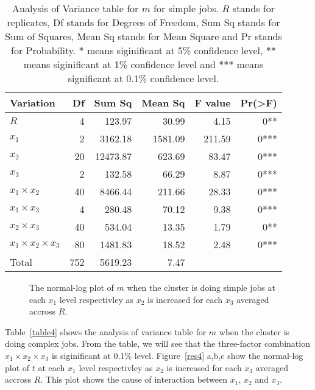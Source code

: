 \documentclass[preprint]{acm_proc_article-sp}
\begin{document}
\begin{table*}
	\caption{Analysis of Variance table for $m$ for simple jobs. $R$ stands for replicates, Df stands for Degrees of Freedom, Sum Sq stands for Sum of Squares, Mean Sq stands for Mean Square and Pr stands for Probability. * means siginificant at 5\% confidence level, ** means siginificant at 1\% confidence level and *** means significant at 0.1\% confidence level.}
	\label{table3}
	\centering
	\begin{tabular}{l|rrrrr}
		\hline\hline
		Variation&Df&Sum Sq&Mean Sq&F value&Pr(>F)\\
		\hline
		$R$&4&123.97&30.99&4.15&0**\\
		$x_1$&2&3162.18&1581.09&211.59&0***\\
		$x_2$&20&12473.87&623.69&83.47&0***\\
		$x_3$&2&132.58&66.29&8.87&0***\\
		$x_1 \times x_2$&40&8466.44&211.66&28.33&0***\\
		$x_1 \times x_3$&4&280.48&70.12&9.38&0***\\
		$x_2 \times x_3$&40&534.04&13.35&1.79&0**\\
		$x_1 \times x_2 \times x_3$&80&1481.83&18.52&2.48&0***\\
		\hline
		Total&752&5619.23&7.47\\
		\hline\hline
	\end{tabular}
\end{table*}

\begin{figure*}[htb]
        \centering
{}
        \caption{The normal-log plot of $m$ when the cluster is doing simple jobs at each $x_1$ level respectivley as $x_2$ is increased for each $x_3$ averaged accross $R$.}
        \label{res3}
\end{figure*}

Table~\ref{table4} shows the analysis of variance table for $m$ when the cluster is doing complex jobs. From the table, we will see that the three-factor combination $x_1 \times x_2 \times x_3$ is siginificant at 0.1\% level. Figure~\ref{res4} a,b,c show the normal-log plot of $t$ at each $x_1$ level respectivley as $x_2$ is increased for each $x_3$ averaged accross $R$. This plot shows the cause of interaction between $x_1$, $x_2$ and $x_3$.
\end{document}
